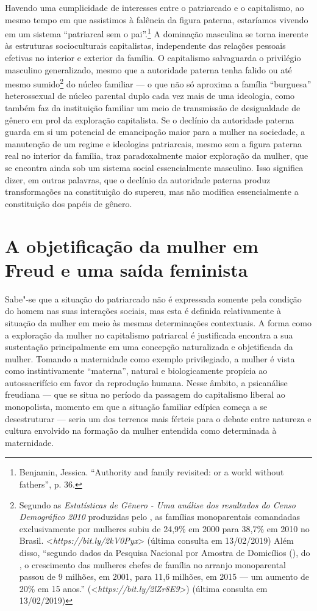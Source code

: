 Havendo uma cumplicidade de interesses entre o patriarcado e o
capitalismo, ao mesmo tempo em que assistimos à falência da figura
paterna, estaríamos vivendo em um sistema ``patriarcal sem o
pai''.\footnote{Benjamin, Jessica. ``Authority and family revisited: or a
  world without fathers'', p. 36.} A dominação masculina se torna
inerente às estruturas socioculturais capitalistas, independente das
relações pessoais efetivas no interior e exterior da família. O
capitalismo salvaguarda o privilégio masculino generalizado, mesmo que a
autoridade paterna tenha falido ou até mesmo sumido\footnote{Segundo as
  \emph{Estatísticas de Gênero - Uma análise dos resultados do Censo
  Demográfico 2010} produzidas pelo , as famílias monoparentais
  comandadas exclusivamente por mulheres subiu de 24,9\% em 2000 para
  38,7\% em 2010 no Brasil.
  \textless{}\emph{https://bit.ly/2kV0Pyx}\textgreater{}
  (última consulta em 13/02/2019) Além disso, ``segundo dados da
  Pesquisa Nacional por Amostra de Domicílios (), do , o
  crescimento das mulheres chefes de família no arranjo monoparental
  passou de 9 milhões, em 2001, para 11,6 milhões, em 2015 --- um aumento
  de 20\% em 15 anos.''
  (\textless{}\emph{https://bit.ly/2lZr8E9}\textgreater{})
  (última consulta em 13/02/2019)} do núcleo familiar --- o que não só
aproxima a família ``burguesa'' heterossexual de núcleo parental duplo
cada vez mais de uma ideologia, como também faz da instituição familiar
um meio de transmissão de desigualdade de gênero em prol da exploração
capitalista. Se o declínio da autoridade paterna guarda em si um
potencial de emancipação maior para a mulher na sociedade, a manutenção
de um regime e ideologias patriarcais, mesmo sem a figura paterna real
no interior da família, traz paradoxalmente maior exploração da mulher,
que se encontra ainda sob um sistema social essencialmente masculino.
Isso significa dizer, em outras palavras, que o declínio da autoridade
paterna produz transformações na constituição do supereu, mas não
modifica essencialmente a constituição dos papéis de gênero.

\section{A objetificação da mulher em Freud e uma saída feminista}

Sabe"-se que a situação do patriarcado não é expressada somente pela
condição do homem nas suas interações sociais, mas esta é definida
relativamente à situação da mulher em meio às mesmas determinações
contextuais. A forma como a exploração da mulher no capitalismo
patriarcal é justificada encontra a sua sustentação principalmente em
uma concepção naturalizada e objetificada da mulher. Tomando a
maternidade como exemplo privilegiado, a mulher é vista como
instintivamente ``materna'', natural e biologicamente propícia ao
autossacrifício em favor da reprodução humana. Nesse âmbito, a
psicanálise freudiana --- que se situa no período da passagem do
capitalismo liberal ao monopolista, momento em que a situação familiar
edípica começa a se desestruturar --- seria um dos terrenos mais férteis
para o debate entre natureza e cultura envolvido na formação da mulher
entendida como determinada à maternidade.

